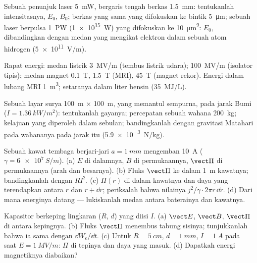 \begin{exercise}[$\star$]\label{exo:b2:poynting-vector:2}
Sebuah penunjuk laser \qty{5}{mW}, bergaris tengah berkas \qty{1.5}{mm}: tentukanlah intensitasnya, $E_0$,
$B_0$; berkas yang sama yang difokuskan ke bintik \qty{5}{\micro m}; sebuah laser
berpulsa \qty{1}{PW} (\qty{1e15}{W}) yang difokuskan ke \qty{10}{\micro m^2}: $E_0$, dibandingkan
dengan medan yang mengikat elektron dalam sebuah atom hidrogen (\qty{5e11}{V/m}).
\end{exercise}

\begin{exercise}[$\star$]\label{exo:b2:poynting-vector:3}
Rapat energi: medan listrik \qty{3}{MV/m} (tembus listrik udara);
\qty{100}{MV/m} (isolator tipis); medan magnet \qty{0.1}{T},
\qty{1.5}{T} (MRI), \qty{45}{T} (magnet rekor). Energi dalam lubang MRI \qty{1}{m^3};
setaranya dalam liter bensin (\qty{35}{MJ/L}).
\end{exercise}

\begin{exercise}[$\star$]\label{exo:b2:poynting-vector:4}
Sebuah layar surya \qty{100}{m} $\times$ \qty{100}{m}, yang memantul sempurna, pada
jarak Bumi ($I = \qty{1.36}{kW/m^2}$): tentukanlah gayanya; percepatan sebuah
wahana \qty{200}{kg}; kelajuan yang diperoleh dalam sebulan; bandingkanlah dengan
gravitasi Matahari pada wahananya pada jarak itu (\qty{5.9e-3}{N/kg}).
\end{exercise}

\begin{exercise}[$\star\star$]\label{exo:b2:poynting-vector:5}
Sebuah kawat tembaga berjari-jari $a = \qty{1}{mm}$ mengemban \qty{10}{A} ($\gamma =
\qty{6e7}{S/m}$). (a) $E$ di dalamnya, $B$ di permukaannya, $\vect\Pi$ di
permukaannya (arah dan besarnya). (b) Fluks $\vect\Pi$ ke dalam \qty{1}{m}
kawatnya; bandingkanlah dengan $RI^2$. (c) $\Pi(r)$ di dalam kawatnya dan daya
yang terendapkan antara $r$ dan $r + \dd r$; periksalah bahwa nilainya $j^2/\gamma\cdot2\pi r\,\dd r$.
(d) Dari mana energinya datang --- lukiskanlah medan antara
baterainya dan kawatnya.
\end{exercise}

\begin{exercise}[$\star\star$]\label{exo:b2:poynting-vector:6}
Kapasitor berkeping lingkaran ($R$, $d$) yang diisi $I$. (a) $\vect E$, $\vect B$,
$\vect\Pi$ di antara kepingnya. (b) Fluks $\vect\Pi$ menembus tabung
sisinya; tunjukkanlah bahwa ia sama dengan $\dd W_e/\dd t$. (c) Untuk $R = \qty{5}{cm}$, $d =
\qty{1}{mm}$, $I = \qty{1}{A}$ pada saat $E = \qty{1}{MV/m}$: $\Pi$ di
tepinya dan daya yang masuk. (d) Dapatkah energi magnetiknya diabaikan?
\end{exercise}

